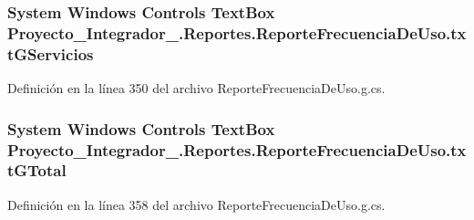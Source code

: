 \hypertarget{class_proyecto___integrador__3_1_1_reportes_1_1_reporte_frecuencia_de_uso_a9460b0c95f1995a1b69bbedac9c7994b}{
\subsubsection[{txt\-G\-Servicios}]{\setlength{\rightskip}{0pt plus 5cm}System Windows Controls Text\-Box Proyecto\-\_\-\-Integrador\-\_.\-Reportes.\-Reporte\-Frecuencia\-De\-Uso.\-txt\-G\-Servicios\hspace{0.3cm}{\ttfamily [package]}}}\label{class_proyecto___integrador__3_1_1_reportes_1_1_reporte_frecuencia_de_uso_a9460b0c95f1995a1b69bbedac9c7994b}


Definición en la línea 350 del archivo Reporte\-Frecuencia\-De\-Uso.\-g.\-cs.

\hypertarget{class_proyecto___integrador__3_1_1_reportes_1_1_reporte_frecuencia_de_uso_ab7449cb696ced128cf9d785055ca3850}{
\subsubsection[{txt\-G\-Total}]{\setlength{\rightskip}{0pt plus 5cm}System Windows Controls Text\-Box Proyecto\-\_\-\-Integrador\-\_.\-Reportes.\-Reporte\-Frecuencia\-De\-Uso.\-txt\-G\-Total\hspace{0.3cm}{\ttfamily [package]}}}\label{class_proyecto___integrador__3_1_1_reportes_1_1_reporte_frecuencia_de_uso_ab7449cb696ced128cf9d785055ca3850}


Definición en la línea 358 del archivo Reporte\-Frecuencia\-De\-Uso.\-g.\-cs.

